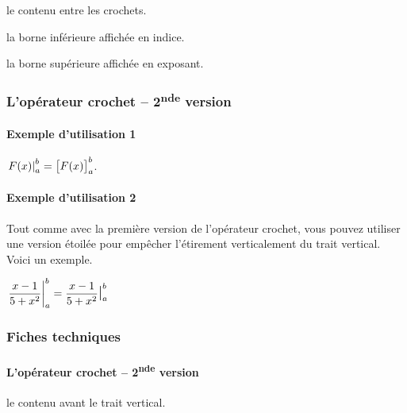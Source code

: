 \documentclass[12pt,a4paper]{article}
\begin{document}

 le contenu entre les crochets.

 la borne inférieure affichée en indice.

 la borne supérieure affichée en exposant.




\subsubsection{L'opérateur crochet -- 2\textsuperscript{nde} version}

\paragraph{Exemple d'utilisation 1}

\begin{latexex}
$\vhook{F(x)}{a}{b}
 = \hook{F(x)}{a}{b}$.
\end{latexex}




\paragraph{Exemple d'utilisation 2}

Tout comme avec la première version de l'opérateur crochet, vous pouvez utiliser une version étoilée pour empêcher l'étirement verticalement du trait vertical. Voici un exemple.

\begin{latexex}
$\displaystyle
 \vhook{\frac{x - 1}{5 + x^2}}{a}{b}
 = \vhook*{\frac{x - 1}{5 + x^2}}{a}{b}$
\end{latexex}




\subsubsection{Fiches techniques}

\paragraph{L'opérateur crochet -- 2\textsuperscript{nde} version}



 le contenu avant le trait vertical.
\end{document}
